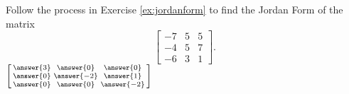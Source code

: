 \documentclass{ximera}
\begin{document}

\begin{exercise}%
    Follow the process in Exercise \ref{ex:jordanform} to find the Jordan Form of the matrix
    \[ 
    \begin{bmatrix} 
    -7 & 5 & 5 \\ 
    -4 & 5 & 7 \\ 
    -6 & 3 & 1 
    \end{bmatrix}. 
    \]
    $\left[\begin{smallmatrix} \answer{3} & \answer{0} & \answer{0} \\ \answer{0} & \answer{-2} & \answer{1} \\ \answer{0} & \answer{0} & \answer{-2} \end{smallmatrix}\right]$
\end{exercise}
\end{document}
